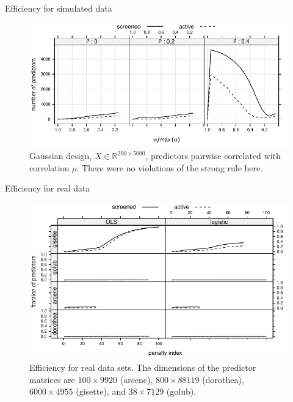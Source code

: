 \documentclass[10pt,ignorenonframetext]{beamer}
\begin{document}
\begin{frame}{Efficiency for simulated data}
  \begin{figure}
    \centering
    \includegraphics[width=\linewidth]{figures/gaussian.pdf}
    \caption{Gaussian design, \(X \in \mathbb{R}^{200\times 5000}\),
      predictors pairwise correlated with correlation \(\rho\). There were no violations of
      the strong rule here.}
  \end{figure}
\end{frame}

\begin{frame}{Efficiency for real data}
  \begin{figure}
    \centering
    \includegraphics[width=\linewidth]{figures/efficiency-real.pdf}
    \caption{Efficiency for real data sets. The dimensions of the predictor matrices
      are \(100 \times 9920\) (arcene), \(800\times 88119\) (dorothea), \(6000\times 4955\)
      (gisette), and \(38 \times 7129\) (golub).}
  \end{figure}
\end{frame}
\end{document}

